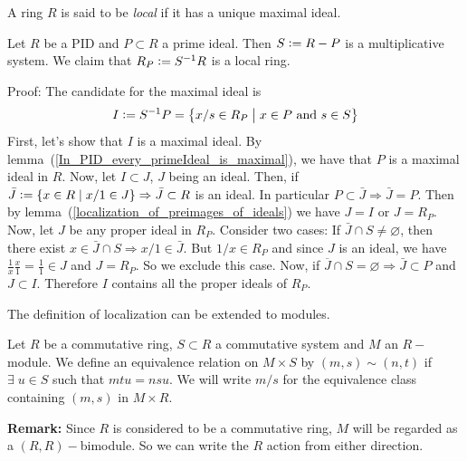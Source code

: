 \begin{dang}
\begin{definition}
    A ring $R$ is said to be \textit{local} if it has a unique maximal ideal.
\end{definition}
\end{dang}
\begin{dang}
    \begin{theorem}\label{localization_at_prime_ideals_on_a_PID}
      Let $R$ be a PID  and $P\subset R$ a prime ideal. Then $S\bydef R-P$ is a multiplicative system. We claim that $R_P\bydef S^{-1}R$ is a local ring.
    \end{theorem}
\end{dang}
Proof: The candidate for the maximal ideal is
\begin{equation}
    I \bydef S^{-1}P = \big\{x/s \in R_P \;\big|\;x\in P\text{ and }s\in S\big\} 
\end{equation}
First, let's show that $I$ is a maximal ideal. By lemma~(\ref{In_PID_every_primeIdeal_is_maximal}), we have that $P$ is a maximal ideal in $R$. Now, let $I\subset J$, $J$ being an ideal. Then, if $\bar{J}\bydef\{x\in R\;|\;x/1\in J\}\Rightarrow\bar{J}\subset R$ is an ideal. In particular  $P\subset\bar{J}\Rightarrow \bar{J}=P$. Then by lemma~(\ref{localization_of_preimages_of_ideals}) we have $J = I$ or $J = R_P$. Now, let $J$ be any proper ideal in $R_P$. Consider two cases: If $\bar{J}\cap S\neq\varnothing$, then there exist $x\in \bar{J}\cap S\Rightarrow x/1\in \bar{J}$. But $1/x\in R_P$ and since $J$ is an ideal, we have $\frac{1}{x}\frac{x}{1}=\frac{1}{1}\in J$ and $J=R_P$. So we exclude this case. Now, if $\overline{J}\cap S=\varnothing\Rightarrow \bar{J}\subset P$ and $J\subset I$. Therefore $I$ contains all the proper ideals of $R_P$.
\par
The definition of localization can be extended to modules.
\begin{dang}
    \begin{definition}
        Let $R$ be a commutative ring, $S\subset R$ a commutative system and $M$ an $R-$module. We define an equivalence relation on $M\times S$ by $(m,s)\sim(n,t)$ if $\exists \;u\in S$ such that $mtu=nsu$. We will write $m/s$ for the equivalence class containing $(m,s)$ in $M\times R$.
    \end{definition}
\end{dang}
\begin{dang}
    \textbf{Remark: }Since $R$ is considered to be a commutative ring, $M$ will be regarded as a $(R,R)-$bimodule. So we can write the $R$ action from either direction.
\end{dang}
